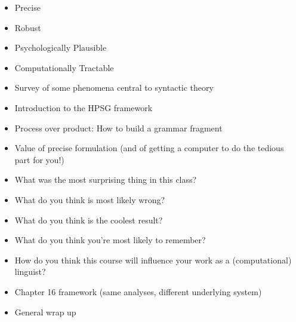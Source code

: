 \documentclass[a4paper,landscape,headrule,footrule]{foils}
\begin{document}

\begin{itemize}
\item Precise
\item Robust
\item Psychologically Plausible
\item Computationally Tractable
\end{itemize}



\begin{itemize}
\item Survey of some phenomena central to 
syntactic theory
\item Introduction to the HPSG framework
\item Process over product: How to build a 
grammar fragment
\item Value of precise formulation (and of getting 
a computer to do the tedious part for you!)
\end{itemize}


\begin{itemize}
\item What was the most surprising thing in this 
class?
\item What do you think is most likely wrong?
\item What do you think is the coolest result?
\item What do you think you’re most likely to 
remember?
\item How do you think this course will influence 
your work as a (computational) linguist?
\end{itemize}



\begin{itemize}
\item Chapter 16 framework (same analyses, 
different underlying system)
\item General wrap up
\end{itemize}
\end{document}
